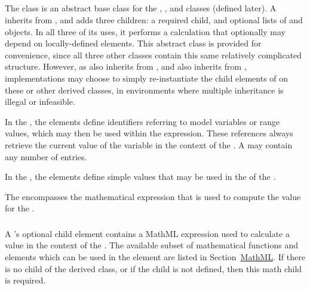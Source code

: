 \subsection{}
\label{class:calculation}
\label{class:listOfVariables}
\label{class:listOfParameters}

The \Calculation class is an abstract base class for the \ComputeChange, \DataGenerator, and \FunctionalRange classes (defined later).  A \Calculation inherits from \SedBase, and adds three children:  a required \Math child, and optional lists of \Variable and \Parameter objects.  In all three of its uses, it performs a calculation that optionally may depend on locally-defined elements.  This abstract class is provided for convenience, since all three other classes contain this same relatively complicated structure.  However, as \FunctionalRange also inherits from \Range, and \ComputeChange also inherits from \Change, implementations may choose to simply re-instantiate the child elements of \Calculation on these or other derived classes, in environments where multiple inheritance is illegal or infeasible.


In the \ListOfVariables, the \Variable elements define identifiers referring to model variables or range values, which may then be used within the \Math expression. These references always retrieve the current value of the variable in the context of the \Calculation.  A \ListOfVariables may contain any number of \Variable entries.

In the \ListOfParameters, the \Parameter elements define simple values that may be used in the \Math of the \Calculation.

The \Math encompasses the mathematical expression that is used to compute the value for the \Calculation.

\subsubsection{}
\label{sec:math}
A \Calculation's optional child element  contains a MathML expression used to calculate a value in the context of the \Calculation.  The available subset of mathematical functions and elements which can be used in the \Math element are listed in Section~\hyperref[sec:mathML]{MathML}.  If there is no child  of the derived class, or if the child  is not defined, then this math child is required.



